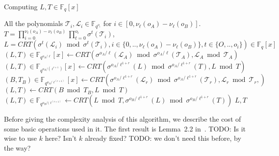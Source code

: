 \documentclass{lms}
\newcommand{\todo}[1]{{\color{red}TODO: #1}}
\begin{document}
\begin{algorithm}
\caption{\label{computingT2ir} Computing $L,T \in \mathbb{F}_q[x]$} 
\begin{algorithmic}[1]
\REQUIRE All the polynomials $\mathcal{T}_i, \mathcal{L}_i \in \mathbb{F}_{q^{o_i}}$ for $i \in [0, \nu_{\ell}(o_A)-\nu_{\ell}(o_B)]$. 
\ENSURE $T=\prod_{i=0}^{\nu_{\ell}(o_A)-\nu_{\ell}(o_B)}\prod_{t=0}^{o_i}\sigma^{t}(\mathcal{T}_i)$, \\ 
$L= CRT(\sigma^{t}(\mathcal{L}_i) \bmod \sigma^{t}(\mathcal{T}_i), i\in \{ 0,.., \nu_{\ell}(o_A)-\nu_{\ell}(o_B) \}  ,t \in \{ O,..,o_i \} ) \in \mathbb{F}_q[x]$
\STATE $\left( L,T \right) \in \mathbb{F}_{q^{o_A/\ell}}[x] \gets CRT \left( \sigma^{o_A/\ell}(\mathcal{L}_A) \bmod  \sigma^{o_A/\ell}(\mathcal{T}_A),\mathcal{L}_A \bmod \mathcal{T}_A \right)$
\STATE $\left( L , T \right) \in \mathbb{F}_{q^{o_A/(\ell^{r+1})}}[x] \gets CRT \left( \sigma^{o_A/\ell^{1+r}}(L) \bmod \sigma^{o_A/\ell^{1+r}}(T), L \bmod T \right) $ 
\STATE $\left( B,T_B \right)\in \mathbb{F}_{q^{o_A/\ell^{(r+1)}}}[x]  \gets CRT \left( \sigma^{o_A/\ell^{1+r}}(\mathcal{L}_r) \bmod \sigma^{o_A/\ell^{1+r}} (\mathcal{T}_r),\mathcal{L}_r \bmod \mathcal{T}_r, \right)$ 
\STATE $\left( L,T \right) \gets CRT \left(B \bmod T_B, L \bmod T \right) $
\ENDFOR
{}%
\STATE $\left( L , T \right)\in \mathbb{F}_{q^{o_B/(\ell^{(r+1)}}} \gets CRT \left( L \bmod T ,\sigma^{o_B/\ell^{1+r}}(L) \bmod \sigma^{o_B/\ell^{1+r}}(T) \right)$
\ENDFOR
\RETURN $L,T$
\end{algorithmic}
\end{algorithm}

Before giving the complexity analysis of this algorithm, we describe
the cost of some basic operations used in it. The first result is
Lemma~2.2 in~\cite{vzgathen+shoup92}.  \todo{Is it wise to use $k$
  here? Isn't $k$ already fixed?}
\todo{we don't need this before, by the way?}
\end{document}
